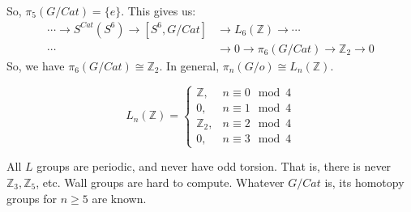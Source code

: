 \documentclass[crop=false,class=article,oneside]{standalone}
\begin{document}
        So, $\pi_{5}(G/Cat)=\{e\}$. This gives us:
        \begin{align*}
            \cdots\rightarrow
            S^{Cat}(S^{6})\rightarrow
            [S^{6},G/Cat]
            &\rightarrow
            L_{6}(\mathbb{Z})\rightarrow\cdots\\
            \cdots
            &\rightarrow{0}\rightarrow\pi_{6}(G/Cat)\rightarrow
            \mathbb{Z}_{2}\rightarrow{0}
        \end{align*}
        So, we have $\pi_{6}(G/Cat)\cong\mathbb{Z}_{2}$.
        In general, $\pi_{n}(G/o)\cong L_{n}(\mathbb{Z})$.
        \begin{theorem}
            \begin{equation*}
                L_{n}(\mathbb{Z})=
                \begin{cases}
                    \mathbb{Z},&n\equiv{0}\mod{4}\\
                    0,&n\equiv{1}\mod{4}\\
                    \mathbb{Z}_{2},&n\equiv{2}\mod{4}\\
                    0,&n\equiv{3}\mod{4}
                \end{cases}
            \end{equation*}
        \end{theorem}
        All $L$ groups are periodic, and never have odd
        torsion. That is, there is never
        $\mathbb{Z}_{3},\mathbb{Z}_{5}$, etc. Wall groups
        are hard to compute. Whatever $G/Cat$ is, its
        homotopy groups for $n\geq 5$ are known.
\end{document}

